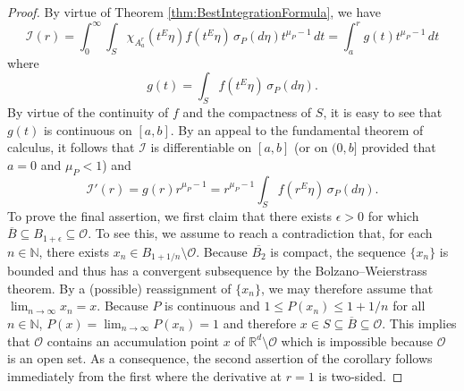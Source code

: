 \documentclass[11pt]{article}
\theoremstyle{remark}
\begin{document}
\begin{proof}
By virtue of Theorem \ref{thm:BestIntegrationFormula}, we have
\begin{equation*}
\mathcal{I}(r)=\int_0^\infty\int_S \chi_{A_a^r}(t^E\eta)f(t^E\eta)\,\sigma_P(d\eta) t^{\mu_P-1}\,dt=\int_a^r g(t)t^{\mu_P-1}\,dt
\end{equation*}
where
\begin{equation*}
g(t)=\int_S f(t^E\eta)\,\sigma_P(d\eta).
\end{equation*}
By virtue of the continuity of $f$ and the compactness of $S$, it is easy to see that $g(t)$ is continuous on $[a,b]$. By an appeal to the fundamental theorem of calculus, it follows that $\mathcal{I}$ is differentiable on $[a,b]$ (or on $(0,b]$ provided that $a=0$ and $\mu_P<1$) and
\begin{equation*}
\mathcal{I}'(r)=g(r)r^{\mu_P-1}=r^{\mu_P-1}\int_S f(r^E\eta)\,\sigma_P(d\eta).
\end{equation*}
To prove the final assertion, we first claim that there exists $\epsilon>0$ for which $\overline{B}\subseteq B_{1+\epsilon}\subseteq \mathcal{O}$. To see this, we assume to reach a contradiction that, for each $n\in\mathbb{N}$, there exists $x_n \in B_{1+1/n} \setminus \mathcal{O}$. Because $\overline{B_2}$ is compact, the sequence $\{x_n\}$ is bounded and thus has a convergent subsequence by the Bolzano–Weierstrass theorem. By a (possible) reassignment of $\{x_n\}$, we may therefore assume that $\lim_{n\to \infty} x_n = x$. Because $P$ is continuous and $1 \leq P(x_n) \leq 1 + 1/n$ for all $n\in \mathbb{N}$, $P(x)=\lim_{n\to\infty}P(x_n)=1$ and therefore $x\in S \subseteq \overline{B} \subseteq \mathcal{O}$. This implies that $\mathcal{O}$ contains an accumulation point $x$ of $\mathbb{R}^d\setminus\mathcal{O}$ which is impossible because $\mathcal{O}$ is an open set. As a consequence, the second assertion of the corollary follows immediately from the first where the derivative at $r=1$ is two-sided.
\end{proof}
\end{document}
